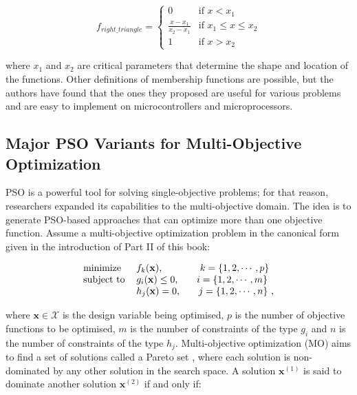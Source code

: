 \begin{equation}
    f_{right\_triangle} = \begin{cases}
    0 & \text{if $x < x_1$}\\
    \frac{x -x_1}{x_2 -x_1} & \text{if $x_1 \leq x \leq x_2$}\\
    1 & \text{if $x > x_2$}
    \end{cases}
\end{equation}

\noindent where $x_1$ and $x_2$ are critical parameters that determine the shape and location of the functions. Other definitions of membership functions are possible, but the authors have found that the ones they proposed are useful for various problems and are easy to implement on microcontrollers and microprocessors.

\subsection{Major PSO Variants for Multi-Objective Optimization}
\label{sec:variants2}

PSO is a powerful tool for solving single-objective problems; for that reason, researchers expanded its capabilities to the multi-objective domain. The idea is to generate PSO-based approaches that can optimize more than one objective function. Assume a multi-objective optimization problem in the canonical form given in the introduction of Part II of this book:

\[
\begin{tabular}{ll}
minimize        & $f_k(\mathbf{x})$, \ \ \ \ \ \ \ \ \ \ \ $k=\{1,2,\cdots,p\}$ \\ 
subject to      & $g_i(\mathbf{x}) \leq 0$, \ \ \ \ \ $i=\{1,2,\cdots,m\}$ \\
                & $h_j(\mathbf{x}) = 0$, \ \ \ \ \ $j=\{1,2,\cdots,n\}$ ,\\
\end{tabular}
\]

\noindent where $\mathbf{x} \in \mathcal{X}$ is the design variable being optimised, $p$ is the number of objective functions to be optimised, $m$ is the number of constraints of the type $g_i$ and $n$ is the number of constraints of the type $h_j$. 
Multi-objective optimization (MO) aims to find a set of solutions called a Pareto set \cite{coello2007evolutionary}, where each solution is non-dominated by any other solution in the search space. A solution $\mathbf{x}^{(1)}$ is said to dominate another solution $\mathbf{x}^{(2)}$ if and only if:

